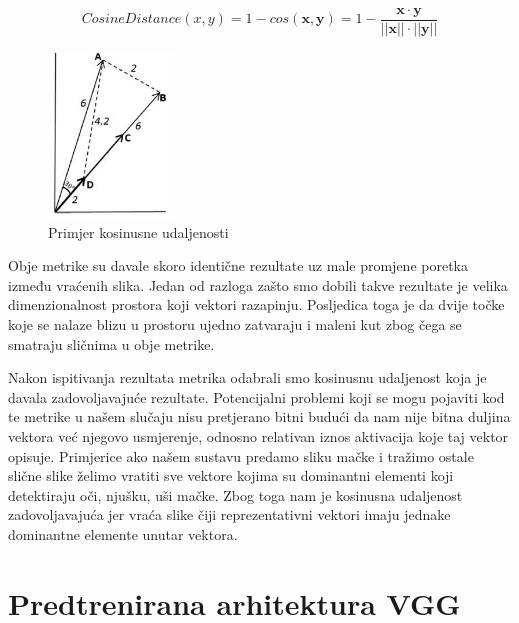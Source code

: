 \documentclass[times, utf8, proizvoljni, numeric]{fer}
\begin{document}
\begin{equation}
\label{eq:kosinusna_udaljenost}
CosineDistance(x,y) = 1- cos(\pmb x, \pmb y) = 1 - \frac {\pmb x \cdot \pmb y}{||\pmb x|| \cdot ||\pmb y||}
\end{equation}

\begin{figure}[!ht]
	\begin{center}
		\captionsetup{justification=centering}
		\includegraphics[width=0.3\textwidth]{./imgs/kosinusna_udaljenost.png}
		\caption{Primjer kosinusne udaljenosti \cite{VectorSimilarity}}
		\label{fg:kosinusna_udaljenost}
	\end{center}
\end{figure}

Obje metrike su davale skoro identične rezultate uz male promjene poretka između vraćenih slika. Jedan od razloga zašto smo dobili takve rezultate je velika dimenzionalnost prostora koji vektori razapinju. Posljedica toga je da dvije točke koje se nalaze blizu u prostoru ujedno zatvaraju i maleni kut zbog čega se smatraju sličnima u obje metrike.	

Nakon ispitivanja rezultata metrika odabrali smo kosinusnu udaljenost koja je davala zadovoljavajuće rezultate. Potencijalni problemi koji se mogu pojaviti kod te metrike u našem slučaju nisu pretjerano bitni budući da nam nije bitna duljina vektora već njegovo usmjerenje, odnosno relativan iznos aktivacija koje taj vektor opisuje. Primjerice ako našem sustavu predamo sliku mačke i tražimo ostale slične slike želimo vratiti sve vektore kojima su dominantni elementi koji detektiraju oči, njušku, uši mačke. Zbog toga nam je kosinusna udaljenost zadovoljavajuća jer vraća slike čiji reprezentativni vektori imaju jednake dominantne elemente unutar vektora.


\section{Predtrenirana arhitektura VGG}
\end{document}
